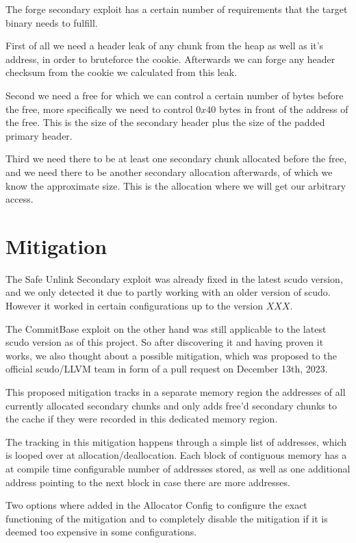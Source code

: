 \documentclass[a4paper,11pt,oneside]{report}
\begin{document}
The forge secondary exploit has a certain number of requirements that the target binary needs to fulfill.

First of all we need a header leak of any chunk from the heap as well as it's address, in order to bruteforce the cookie. Afterwards we can forge any header checksum from the cookie we calculated from this leak.

Second we need a free for which we can control a certain number of bytes before the free, more specifically we need to control $0x40$ bytes in front of the address of the free. This is the size of the secondary header plus the size of the padded primary header.

Third we need there to be at least one secondary chunk allocated before the free, and we need there to be another secondary allocation afterwards, of which we know the approximate size. This is the allocation where we will get our arbitrary access.




\chapter{Mitigation}

The Safe Unlink Secondary exploit was already fixed in the latest scudo version, and
we only detected it due to partly working with an older version of scudo. However it
worked in certain configurations up to the version $XXX$.

The CommitBase exploit on the other hand was still applicable to the latest scudo
version as of this project. So after discovering it and having proven it works, we
also thought about a possible mitigation, which was proposed to the official scudo/LLVM
team in form of a pull request on December 13th, 2023.

This proposed mitigation tracks in a separate memory region the addresses of all currently allocated secondary chunks and only adds free'd secondary chunks to the cache if they were recorded in this dedicated memory region.

The tracking in this mitigation happens through a simple list of addresses, which is looped over at allocation/deallocation. Each block of contiguous memory has a at compile time configurable number of addresses stored, as well as one additional address pointing to the next block in case there are more addresses.

Two options where added in the Allocator Config to configure the exact functioning
of the mitigation and to completely disable the mitigation if it is deemed too
expensive in some configurations.
\end{document}
